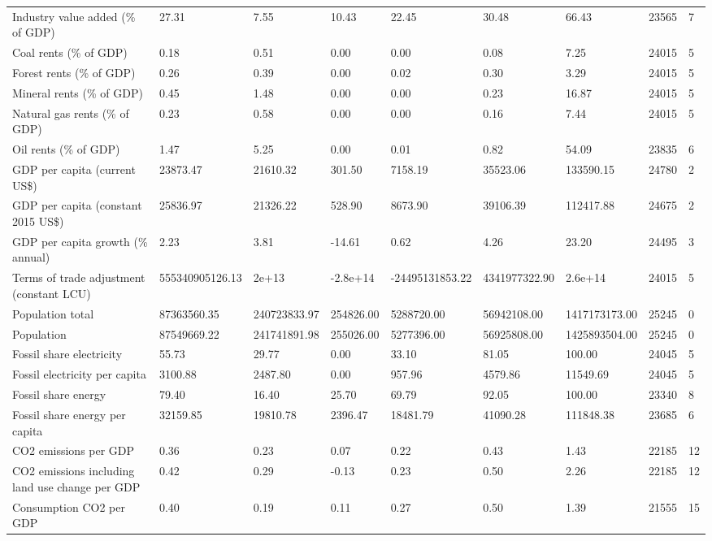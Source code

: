 \begin{longtable}{lllllllll}
Industry value added (\% of GDP) & 27.31 & 7.55 & 10.43 & 22.45 & 30.48 & 66.43 & 23565 & 7\\
Coal rents (\% of GDP) & 0.18 & 0.51 & 0.00 & 0.00 & 0.08 & 7.25 & 24015 & 5\\
Forest rents (\% of GDP) & 0.26 & 0.39 & 0.00 & 0.02 & 0.30 & 3.29 & 24015 & 5\\
\addlinespace
Mineral rents (\% of GDP) & 0.45 & 1.48 & 0.00 & 0.00 & 0.23 & 16.87 & 24015 & 5\\
Natural gas rents (\% of GDP) & 0.23 & 0.58 & 0.00 & 0.00 & 0.16 & 7.44 & 24015 & 5\\
Oil rents (\% of GDP) & 1.47 & 5.25 & 0.00 & 0.01 & 0.82 & 54.09 & 23835 & 6\\
GDP per capita (current US\$) & 23873.47 & 21610.32 & 301.50 & 7158.19 & 35523.06 & 133590.15 & 24780 & 2\\
GDP per capita (constant 2015 US\$) & 25836.97 & 21326.22 & 528.90 & 8673.90 & 39106.39 & 112417.88 & 24675 & 2\\
\addlinespace
GDP per capita growth (\% annual) & 2.23 & 3.81 & -14.61 & 0.62 & 4.26 & 23.20 & 24495 & 3\\
Terms of trade adjustment (constant LCU) & 555340905126.13 & 2e+13 & -2.8e+14 & -24495131853.22 & 4341977322.90 & 2.6e+14 & 24015 & 5\\
Population total & 87363560.35 & 240723833.97 & 254826.00 & 5288720.00 & 56942108.00 & 1417173173.00 & 25245 & 0\\
Population & 87549669.22 & 241741891.98 & 255026.00 & 5277396.00 & 56925808.00 & 1425893504.00 & 25245 & 0\\
Fossil share electricity & 55.73 & 29.77 & 0.00 & 33.10 & 81.05 & 100.00 & 24045 & 5\\
\addlinespace
Fossil electricity per capita & 3100.88 & 2487.80 & 0.00 & 957.96 & 4579.86 & 11549.69 & 24045 & 5\\
Fossil share energy & 79.40 & 16.40 & 25.70 & 69.79 & 92.05 & 100.00 & 23340 & 8\\
Fossil share energy per capita & 32159.85 & 19810.78 & 2396.47 & 18481.79 & 41090.28 & 111848.38 & 23685 & 6\\
CO2 emissions per GDP & 0.36 & 0.23 & 0.07 & 0.22 & 0.43 & 1.43 & 22185 & 12\\
CO2 emissions including land use change per GDP & 0.42 & 0.29 & -0.13 & 0.23 & 0.50 & 2.26 & 22185 & 12\\
\addlinespace
Consumption CO2 per GDP & 0.40 & 0.19 & 0.11 & 0.27 & 0.50 & 1.39 & 21555 & 15\\

\end{longtable}
